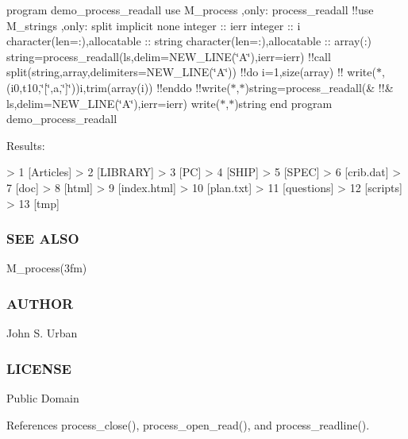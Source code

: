 program demo\+\_\+process\+\_\+readall use M\+\_\+process ,only\+: process\+\_\+readall !!use M\+\_\+strings ,only\+: split implicit none integer \+:\+: ierr integer \+:\+: i character(len=\+:),allocatable \+:\+: string character(len=\+:),allocatable \+:\+: array(\+:) string=process\+\_\+readall(\textquotesingle{}ls\textquotesingle{},delim=N\+E\+W\+\_\+\+L\+I\+NE(\char`\"{}\+A\char`\"{}),ierr=ierr) !!call split(string,array,delimiters=N\+E\+W\+\_\+\+L\+I\+NE(\char`\"{}\+A\char`\"{})) !!do i=1,size(array) !! write($\ast$,\textquotesingle{}(i0,t10,\char`\"{}\mbox{[}\char`\"{},a,\char`\"{}\mbox{]}\char`\"{})\textquotesingle{})i,trim(array(i)) !!enddo !!write($\ast$,$\ast$)string=process\+\_\+readall(\& !!\& \textquotesingle{}ls\textquotesingle{},delim=N\+E\+W\+\_\+\+L\+I\+NE(\char`\"{}\+A\char`\"{}),ierr=ierr) write($\ast$,$\ast$)string end program demo\+\_\+process\+\_\+readall

Results\+: \begin{DoxyVerb}> 1     [Articles]
> 2     [LIBRARY]
> 3     [PC]
> 4     [SHIP]
> 5     [SPEC]
> 6     [crib.dat]
> 7     [doc]
> 8     [html]
> 9     [index.html]
> 10    [plan.txt]
> 11    [questions]
> 12    [scripts]
> 13    [tmp]
\end{DoxyVerb}


\subsubsection*{S\+EE A\+L\+SO}

M\+\_\+process(3fm) \subsubsection*{A\+U\+T\+H\+OR}

John S. Urban \subsubsection*{L\+I\+C\+E\+N\+SE}

Public Domain 

References process\+\_\+close(), process\+\_\+open\+\_\+read(), and process\+\_\+readline().

